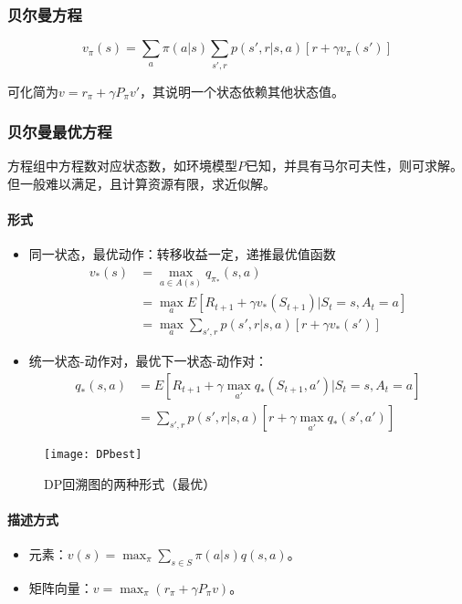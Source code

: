 \documentclass[
12pt, %
a4paper, 
oneside, %
headinclude,footinclude, %
]{scrartcl}
\begin{document}
\subsubsection{贝尔曼方程}
$$ v_\pi(s) = \sum_a \pi(a|s) \sum_{s', r} p(s', r|s, a) [r + \gamma v_\pi(s')] $$

可化简为$ v = r_\pi + \gamma P_\pi v' $，其说明一个状态依赖其他状态值。
\subsubsection{贝尔曼最优方程}
方程组中方程数对应状态数，如环境模型$ P $已知，并具有马尔可夫性，则可求解。但一般难以满足，且计算资源有限，求近似解。
\paragraph{形式}
\begin{itemize}
\item 同一状态，最优动作：转移收益一定，递推最优值函数
\begin{align*}
v_*(s) 
&= \max_{a \in A(s)} q_{\pi_*}(s, a) \\
&= \max_a E[R_{t + 1} + \gamma v_*(S_{t + 1}) | S_t = s, A_t = a] \\
&= \max_a \sum_{s', r} p(s', r|s, a)[r + \gamma v_*(s')]
\end{align*}
\item 统一状态-动作对，最优下一状态-动作对：
\begin{align*}
q_*(s, a) 
&= E[R_{t + 1} + \gamma \max_{a'} q_*(S_{t + 1}, a') | S_t = s, A_t = a] \\
&= \sum_{s', r} p(s', r|s, a)[r + \gamma \max_{a'} q_*(s', a')]
\end{align*}
\end{itemize}

\begin{figure}[H]
\centering 
\texttt{[image: DPbest]} 
\caption[DP回溯图的两种形式（最优）]{DP回溯图的两种形式（最优）}
\end{figure}
\paragraph{描述方式}
\begin{itemize}
\item 元素：$ v(s) = \max_{\pi} \sum_{s \in S}\pi(a|s)q(s,a) $。
\item 矩阵向量：$ v = \max_{\pi} (r_\pi + \gamma P_\pi v) $。
\end{itemize}
\end{document}
